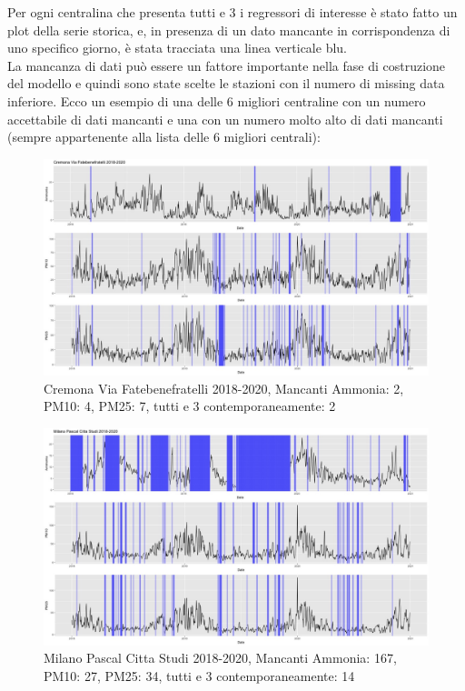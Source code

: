 \documentclass{article}
\begin{document}
Per ogni centralina che presenta tutti e 3 i regressori di interesse è stato fatto
un plot della serie storica, e, in presenza di un dato mancante in corrispondenza   
di uno specifico giorno, è stata tracciata una linea verticale blu.
\\La mancanza di dati può essere un fattore importante nella fase di 
costruzione del modello
e quindi sono state scelte le stazioni con il numero di missing data inferiore.
Ecco un esempio di una  delle 6 migliori centraline con un numero accettabile di dati mancanti e una con
un numero molto alto di dati mancanti (sempre appartenente alla lista delle 6 migliori centrali):

\begin{figure}[H]
    \centering
    \includegraphics[scale=0.35]{Picture/Cremona Via Fatebenefratelli 2018-2020 .jpeg} 
    \caption{Cremona Via Fatebenefratelli 2018-2020, Mancanti Ammonia: 2, PM10: 4, PM25: 7, tutti e 3 contemporaneamente: 2}
    \centering
\end{figure}

\begin{figure}[H]
    \includegraphics[scale=0.35]{Picture/Milano Pascal Citta Studi 2018-2020 .jpeg}
    \caption{Milano Pascal Citta Studi 2018-2020, Mancanti Ammonia: 167, PM10: 27, PM25: 34, tutti e 3 contemporaneamente: 14}
\end{figure}
\end{document}
